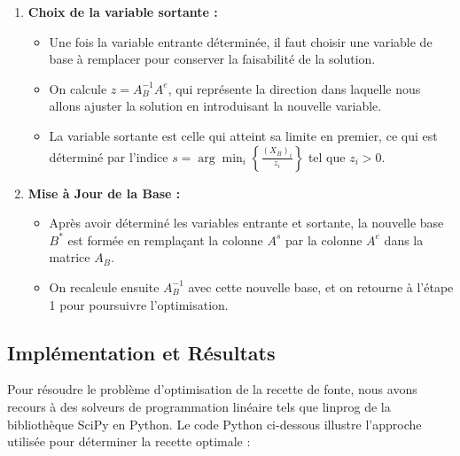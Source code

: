 \documentclass[12pt]{article}
\begin{document}
\begin{enumerate}
    \item \textbf{Choix de la variable sortante :}
    \begin{itemize}
        \item Une fois la variable entrante déterminée, il faut choisir une variable de base à remplacer pour conserver la faisabilité de la solution.
        \item On calcule \( z = A_B^{-1} A^e \), qui représente la direction dans laquelle nous allons ajuster la solution en introduisant la nouvelle variable.
        \item La variable sortante est celle qui atteint sa limite en premier, ce qui est déterminé par l'indice \( s = \arg\min_i \left\{ \frac{(X_B)_i}{z_i} \right\} \) tel que \( z_i > 0 \).
    \end{itemize}

    \item \textbf{Mise à Jour de la Base :}
    \begin{itemize}
        \item Après avoir déterminé les variables entrante et sortante, la nouvelle base \( B^* \) est formée en remplaçant la colonne \( A^s \) par la colonne \( A^e \) dans la matrice \( A_B \).
        \item On recalcule ensuite \( A_B^{-1} \) avec cette nouvelle base, et on retourne à l'étape 1 pour poursuivre l'optimisation.
    \end{itemize}
\end{enumerate}






\subsection{Implémentation et Résultats }



Pour résoudre le problème d'optimisation de la recette de fonte, nous 
avons recours à des solveurs de programmation linéaire tels que linprog 
de la bibliothèque SciPy en Python. Le code Python ci-dessous illustre 
l'approche utilisée pour déterminer la recette optimale :
\end{document}
